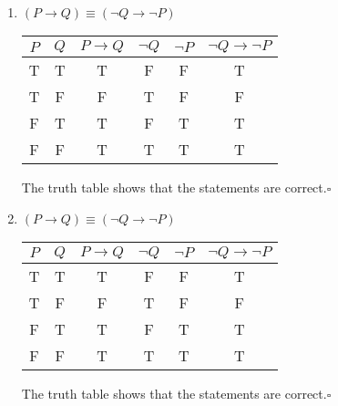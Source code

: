 \documentclass[11pt]{article}
\begin{document}
\begin{enumerate}
	\item $(P \rightarrow Q) \equiv (\neg Q \rightarrow \neg P)$
	      \begin{center}
		      \begin{tabular}{|c|c|c|c|c|c|}
			      \hline
			      $P$ & $Q$ & $P \rightarrow Q$ & $\neg Q$ & $\neg P$ & $\neg Q \rightarrow \neg P$ \\
			      \hline
			      T   & T   & T                 & F        & F        & T                           \\
			      T   & F   & F                 & T        & F        & F                           \\
			      F   & T   & T                 & F        & T        & T                           \\
			      F   & F   & T                 & T        & T        & T                           \\
			      \hline
		      \end{tabular}
	      \end{center}
	      The truth table shows that the statements are correct.\qquad $\square$

	\item $(P \rightarrow Q) \equiv (\neg Q \rightarrow \neg P)$
	      \begin{center}
		      \begin{tabular}{|c|c|c|c|c|c|}
			      \hline
			      $P$ & $Q$ & $P \rightarrow Q$ & $\neg Q$ & $\neg P$ & $\neg Q \rightarrow \neg P$ \\
			      \hline
			      T   & T   & T                 & F        & F        & T                           \\
			      T   & F   & F                 & T        & F        & F                           \\
			      F   & T   & T                 & F        & T        & T                           \\
			      F   & F   & T                 & T        & T        & T                           \\
			      \hline
		      \end{tabular}
	      \end{center}
	      The truth table shows that the statements are correct.\qquad $\square$



\end{enumerate}
\end{document}
